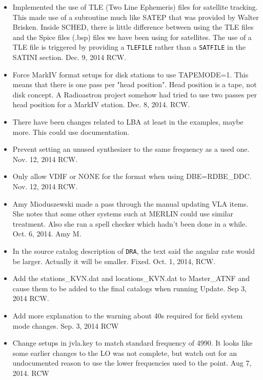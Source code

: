 \documentclass{report}
\begin{document}
\begin{itemize}

\item Implemented the use of TLE (Two Line Ephemeris) files for
satellite tracking.  This made use of a subroutine much like SATEP
that was provided by Walter Brisken.  Inside SCHED, there is little
difference between using the TLE files and the Spice files (.bsp)
files we have been using for satellites.  The use of a TLE file is
triggered by providing a {\tt TLEFILE} rather than a {\tt SATFILE} in
the SATINI section.  Dec. 9, 2014 RCW.

\item Force MarkIV format setups for disk stations to use TAPEMODE=1.
This means that there is one pass per "head position".  Head position
is a tape, not disk concept.  A Radioastron project somehow had 
tried to use two passes per head position for a MarkIV station.
Dec. 8, 2014.  RCW.

\item There have been changes related to LBA at least in the examples,
maybe more.  This could use documentation.

\item Prevent setting an unused synthesizer to the same frequency
as a used one.  Nov. 12, 2014  RCW.

\item Only allow VDIF or NONE for the format when using DBE=RDBE\_DDC.
Nov. 12, 2014  RCW.

\item Amy Mioduszewski made a pass through the manual updating VLA
items.  She notes that some other systems such at MERLIN could use
similar treatment.  Also she ran a spell checker which hadn't been
done in a while.  Oct. 6, 2014.  Amy M.

\item In the source catalog description of {\tt DRA}, the text said
the angular rate would be larger.  Actually it will be smaller.
Fixed.  Oct. 1, 2014, RCW.

\item Add the stations\_KVN.dat and locations\_KVN.dat to
Master\_ATNF and
cause them to be added to the final catalogs when running Update.  Sep
3, 2014  RCW.

\item Add more explanation to the warning about 40s required for field
system mode changes.  Sep. 3, 2014  RCW

\item Change setups in jvla.key to match standard frequency of 4990.  It
looks like some earlier changes to the LO was not complete, but watch
out for an undocumented reason to use the lower frequencies used to the 
point.  Aug 7, 2014.  RCW


\end{itemize}
\end{document}
